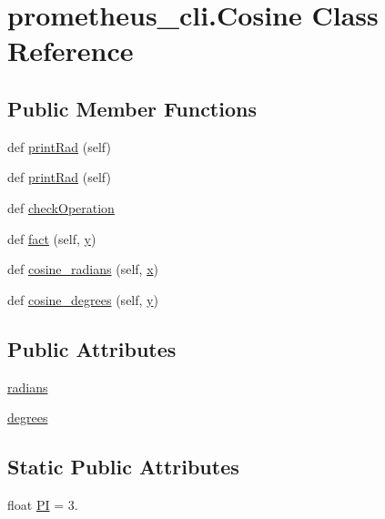 \hypertarget{classprometheus__cli_1_1_cosine}{}\section{prometheus\+\_\+cli.\+Cosine Class Reference}
\label{classprometheus__cli_1_1_cosine}
\subsection*{Public Member Functions}
\begin{DoxyCompactItemize}
\item 
def \hyperlink{classprometheus__cli_1_1_cosine_a21e9785f009e823decf6a3a34b420474}{print\+Rad} (self)
\item 
def \hyperlink{classprometheus__cli_1_1_cosine_a21e9785f009e823decf6a3a34b420474}{print\+Rad} (self)
\item 
def \hyperlink{classprometheus__cli_1_1_cosine_a06b4fa3fab805d521e743a43308f2614}{check\+Operation}
\item 
def \hyperlink{classprometheus__cli_1_1_cosine_ad87135c928a05e0208cd007f9e1bccc8}{fact} (self, \hyperlink{namespaceprometheus__cli_accf154f79f78ac17fe06c8028e3da02d}{y})
\item 
def \hyperlink{classprometheus__cli_1_1_cosine_a5c4b4a397cfecb63dc4352c482b89942}{cosine\+\_\+radians} (self, \hyperlink{namespaceprometheus__cli_a879d50c5fa9ad1ef941818d332417a9b}{x})
\item 
def \hyperlink{classprometheus__cli_1_1_cosine_a3a95304d800a9766a58a53ab33d36db8}{cosine\+\_\+degrees} (self, \hyperlink{namespaceprometheus__cli_accf154f79f78ac17fe06c8028e3da02d}{y})
\end{DoxyCompactItemize}
\subsection*{Public Attributes}
\begin{DoxyCompactItemize}
\item 
\hyperlink{classprometheus__cli_1_1_cosine_a26ea80dbac47c25e1f22e33f70b78cca}{radians}
\item 
\hyperlink{classprometheus__cli_1_1_cosine_a31d6544340dd96d7e48a4493dba1bc00}{degrees}
\end{DoxyCompactItemize}
\subsection*{Static Public Attributes}
\begin{DoxyCompactItemize}
\item 
float \hyperlink{classprometheus__cli_1_1_cosine_a7a990d68b5e124f572c17681347855fe}{P\+I} = 3.
\end{DoxyCompactItemize}


